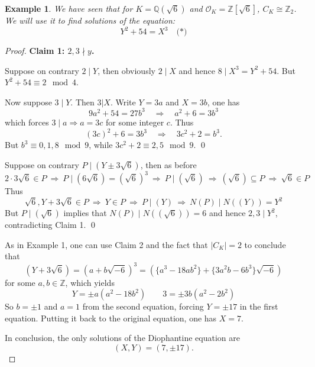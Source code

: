 \documentclass[11pt]{book}
\newtheorem{example}[theorem]{Example}
\begin{document}
\begin{example}
We have seen that for $K = \mathbb{Q}(\sqrt{6})$ and $\mathcal{O}_K = \mathbb{Z}[\sqrt{6}]$, $C_K \cong \mathbb{Z}_2$. We will use it to find solutions of the equation:
\[
Y^2 + 54 = X^3 \quad \text{(*)}
\]
\end{example}
\begin{proof} {\bf Claim 1: $2, 3 \nmid y$.}

Suppose on contrary $2 \mid Y$, then obviously $2 \mid X$ and hence $8 \mid X^3 = Y^2 + 54$. But $Y^2+54 \equiv 2 \mod 4$. 

Now suppose $3 \mid Y$. Then $3 | X$. Write $Y = 3a$ and $X = 3b$, one has
$$9a^2 + 54 = 27b^3 \quad \Rightarrow \quad a^2 + 6 = 3b^3$$
which forces $3 \mid a \Rightarrow a =3c$ for some integer $c$. Thus
$$(3c)^2 + 6 = 3b^3 \quad \Rightarrow\quad 3c^2 + 2 = b^3.$$
But $b^3 \equiv 0,1,8 \mod 9$, while $3c^2 + 2 \equiv 2, 5 \mod 9$.  \qed

\medskip
{}

Suppose on contrary $P \mid (Y \pm 3\sqrt{6})$, then as before
$$2 \cdot 3\sqrt{6} \in P \ \Rightarrow\ P \mid (6\sqrt{6}) = (\sqrt{6})^3 \ \Rightarrow \ P \mid (\sqrt{6})\ \Rightarrow \ (\sqrt{6}) \subseteq P \ \Rightarrow \ \sqrt{6} \in P$$
Thus
$$\sqrt{6}, Y + 3\sqrt{6} \in P\ \Rightarrow\ Y \in P \ \Rightarrow \  P \mid (Y)\ \Rightarrow\ N(P) \mid N((Y)) = Y^2$$
But $P \mid  (\sqrt{6})$ implies that $N(P) \mid N((\sqrt{6})) = 6$ and hence $2,3 \mid Y^2$, contradicting Claim 1. \qed


\bigskip
As in Example 1, one can use Claim 2 and the fact that $|C_K| =2$ to conclude that 
$$(Y + 3\sqrt{6}) = (a + b \sqrt{-6})^3 = (\{a^3-18ab^2\} + \{3a^2b-6b^3\}\sqrt{-6})$$
for some $a,b \in \mathbb{Z}$, which yields
$$Y = \pm a(a^2-18b^2) \quad \quad 3 = \pm 3b(a^2-2b^2)$$
So $b = \pm 1$ and $a = 1$ from the second equation, forcing $Y = \pm 17$ in the first equation. Putting it back to the original equation, one has $X = 7$.

\medskip
In conclusion, the only solutions of the Diophantine equation are
\[
(X,Y) = (7, \pm 17).
\]
\end{proof}
\end{document}
